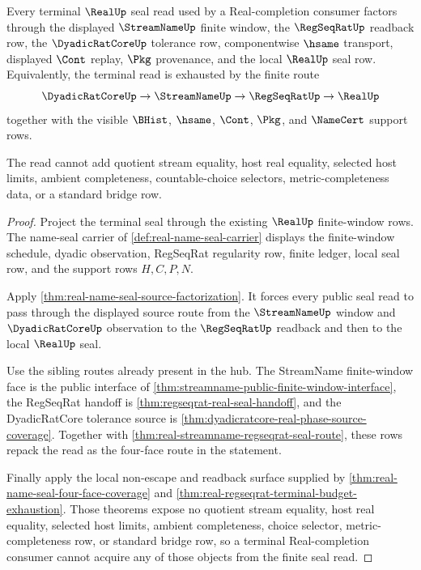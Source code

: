 \begin{theorem}
\label{thm:real-finite-window-seal-exhaustion}
Every terminal $\RealUp$ seal read used by a Real-completion consumer factors through the displayed $\StreamNameUp$ finite window, the $\RegSeqRatUp$ readback row, the $\DyadicRatCoreUp$ tolerance row, componentwise $\hsame$ transport, displayed $\Cont$ replay, $\Pkg$ provenance, and the local $\RealUp$ seal row. Equivalently, the terminal read is exhausted by the finite route
$$
\DyadicRatCoreUp \to \StreamNameUp \to \RegSeqRatUp \to \RealUp
$$
together with the visible $\BHist$, $\hsame$, $\Cont$, $\Pkg$, and $\NameCert$ support rows.

The read cannot add quotient stream equality, host real equality, selected host limits, ambient completeness, countable-choice selectors, metric-completeness data, or a standard bridge row.
\end{theorem}
\begin{proof}
Project the terminal seal through the existing $\RealUp$ finite-window rows. The name-seal carrier of \autoref{def:real-name-seal-carrier} displays the finite-window schedule, dyadic observation, RegSeqRat regularity row, finite ledger, local seal row, and the support rows $H,C,P,N$.

Apply \autoref{thm:real-name-seal-source-factorization}. It forces every public seal read to pass through the displayed source route from the $\StreamNameUp$ window and $\DyadicRatCoreUp$ observation to the $\RegSeqRatUp$ readback and then to the local $\RealUp$ seal.

Use the sibling routes already present in the hub. The StreamName finite-window face is the public interface of \autoref{thm:streamname-public-finite-window-interface}, the RegSeqRat handoff is \autoref{thm:regseqrat-real-seal-handoff}, and the DyadicRatCore tolerance source is \autoref{thm:dyadicratcore-real-phase-source-coverage}. Together with \autoref{thm:real-streamname-regseqrat-seal-route}, these rows repack the read as the four-face route in the statement.

Finally apply the local non-escape and readback surface supplied by \autoref{thm:real-name-seal-four-face-coverage} and \autoref{thm:real-regseqrat-terminal-budget-exhaustion}. Those theorems expose no quotient stream equality, host real equality, selected host limits, ambient completeness, choice selector, metric-completeness row, or standard bridge row, so a terminal Real-completion consumer cannot acquire any of those objects from the finite seal read.
\end{proof}

